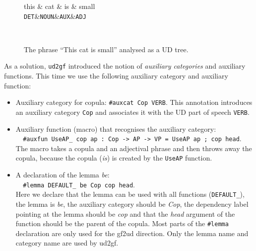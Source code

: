 

\begin{figure}
    \centering
    \begin{dependency}
       \begin{deptext}[column sep=0.4cm]
             this \& cat \& is \& small \\
           {\tt DET}\&{\tt NOUN}\&{\tt AUX}\&{\tt ADJ}\\
       \end{deptext}
    \end{dependency} \\
    \caption{The phrase ``This cat is small'' analysed as a UD tree.}
    \label{fig:ud-this-cat-is-small}
\end{figure}

As a solution, \verb|ud2gf| introduced the notion of \emph{auxiliary categories} and auxiliary functions.
This time we use the following auxiliary category and auxiliary function:
\begin{itemize}
    \item Auxiliary category for copula: \verb|#auxcat Cop VERB|. This annotation introduces an auxiliary category \texttt{Cop} and associates it with the UD part of speech \texttt{VERB}.
    \item Auxiliary function (macro) that recognises the auxiliary category: \\
          \verb|  #auxfun UseAP_ cop ap : Cop -> AP -> VP = UseAP ap ; cop head|. \\
          The macro takes a copula and an adjectival phrase and then throws away the copula, because the copula (\emph{is}) is created by the \texttt{UseAP} function.
    \item A declaration of the lemma \emph{be}: \\ \verb|  #lemma DEFAULT_ be Cop cop head|. \\
    Here we declare that the lemma can be used with all functions (\verb|DEFAULT_|), the lemma is \emph{be}, the auxiliary category should be \emph{Cop}, the dependency label pointing at the lemma should be \emph{cop} and that the \emph{head} argument of the function should be the parent of the copula. Most parts of the \verb|#lemma| declaration are only used for the gf2ud direction. Only the lemma name and category name are used by ud2gf.
\end{itemize}


